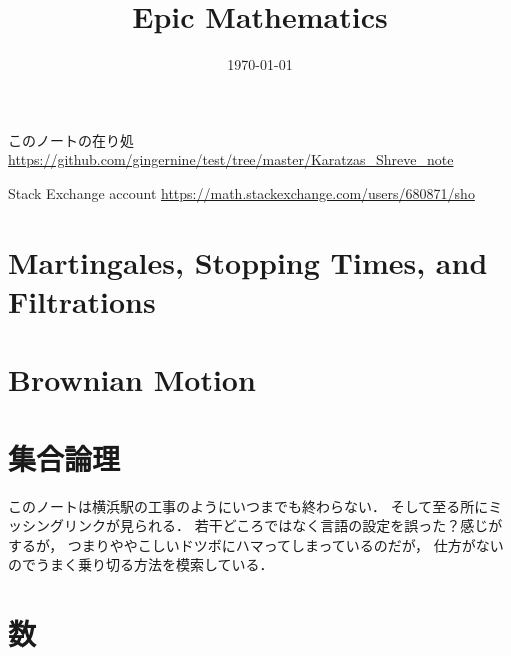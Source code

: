 \documentclass[a4j,10.5pt,oneside,openany]{jsbook}
\title{Epic Mathematics}
\date{\today}
\theoremstyle{mystyle}
\begin{document}
%
%
\maketitle
	このノートの在り処 \url{https://github.com/gingernine/test/tree/master/Karatzas_Shreve_note}

	Stack Exchange account \url{https://math.stackexchange.com/users/680871/sho}
	
%
%
%
\tableofcontents
\frontmatter
%
\mainmatter
%
\chapter{Martingales, Stopping Times, and Filtrations}








\chapter{Brownian Motion}









\appendix
\chapter{集合論理}
	このノートは横浜駅の工事のようにいつまでも終わらない．
	そして至る所にミッシングリンクが見られる．
	若干どころではなく言語の設定を誤った？感じがするが，
	つまりややこしいドツボにハマってしまっているのだが，
	仕方がないのでうまく乗り切る方法を模索している．
	\label{sec:logic_and_set_theory}
	
	
	
	
	
	
	
	
	
	
	
	
	

\chapter{数}
	
	
\end{document}
